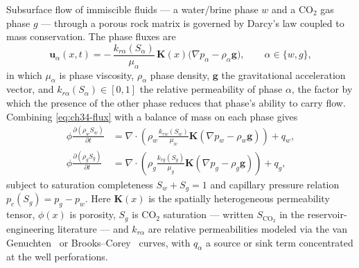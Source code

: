Subsurface flow of immiscible fluids --- a water/brine phase $w$ and a
$\mathrm{CO}_2$ gas phase $g$ --- through a porous rock matrix is governed by
Darcy's law coupled to mass conservation. The phase fluxes are
\begin{equation}
  \mathbf{u}_\alpha(x,t) = -\,\frac{k_{r\alpha}(S_\alpha)}{\mu_\alpha}\,\mathbf{K}(x)\big(\nabla p_\alpha - \rho_\alpha \mathbf{g}\big), \qquad \alpha \in \{w, g\},
  \label{eq:ch34-flux}
\end{equation}
in which $\mu_\alpha$ is phase viscosity, $\rho_\alpha$ phase density,
$\mathbf{g}$ the gravitational acceleration vector, and
$k_{r\alpha}(S_\alpha) \in [0,1]$ the relative permeability of phase $\alpha$, the
factor by which the presence of the other phase reduces that phase's ability to
carry flow. Combining \eqref{eq:ch34-flux} with a balance of mass on each phase
gives
\begin{align}
  \phi \frac{\partial (\rho_w S_w)}{\partial t} &= \nabla \cdot \left( \rho_w \frac{k_{rw}(S_w)}{\mu_w} \mathbf{K} (\nabla p_w - \rho_w \mathbf{g}) \right) + q_w, \label{eq:ch34-cons-w}\\
  \phi \frac{\partial (\rho_g S_g)}{\partial t} &= \nabla \cdot \left( \rho_g \frac{k_{rg}(S_g)}{\mu_g} \mathbf{K} (\nabla p_g - \rho_g \mathbf{g}) \right) + q_g, \label{eq:ch34-cons-g}
\end{align}
subject to saturation completeness $S_w + S_g = 1$ and capillary pressure
relation $p_c(S_g) = p_g - p_w$. Here $\mathbf{K}(x)$ is the spatially
heterogeneous permeability tensor, $\phi(x)$ is porosity, $S_g$ is
$\mathrm{CO}_2$ saturation --- written $S_{\mathrm{CO}_2}$ in the
reservoir-engineering literature --- and
$k_{r\alpha}$ are relative permeabilities modeled via the van
Genuchten~\cite{vanguchten1980closed} or Brooks--Corey~\cite{brooks1964hydraulic} curves, with $q_\alpha$ a source or sink term concentrated at the
well perforations.

